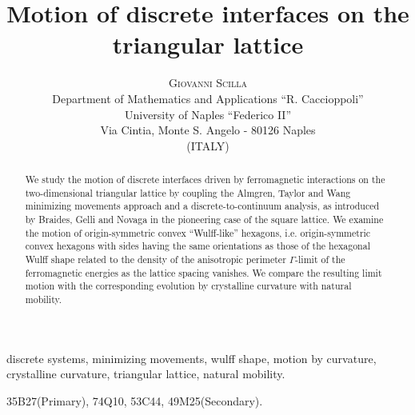 \documentclass{interact}
\numberwithin{equation}{section}
\theoremstyle{definition}
\begin{document}
\title{Motion of discrete interfaces on the triangular lattice}

\author{{\scshape Giovanni Scilla}\\
Department of Mathematics and Applications ``R. Caccioppoli''\\ University of Naples ``Federico II''\\
Via Cintia, Monte S. Angelo - 80126 Naples \\
(ITALY)}
\date{}


\maketitle

\begin{abstract}\noindent
We study the motion of discrete interfaces driven by ferromagnetic interactions on the two-dimensional triangular lattice by coupling the Almgren, Taylor and Wang minimizing movements approach and a discrete-to-continuum analysis, as introduced by Braides, Gelli and Novaga in the pioneering case of the square lattice. We examine the motion of origin-symmetric convex ``Wulff-like'' hexagons, i.e. origin-symmetric convex hexagons with sides having the same orientations as those of the %
hexagonal Wulff shape related to the density of the anisotropic perimeter %
$\Gamma$-limit of the ferromagnetic energies as the lattice spacing vanishes.%
We compare the resulting limit motion %
with the corresponding evolution by crystalline curvature with natural mobility.
\end{abstract}

\begin{keywords}
discrete systems, minimizing movements, wulff shape, motion by curvature, crystalline curvature, triangular lattice, natural mobility.
\end{keywords}

\begin{amscode}
35B27(Primary), 74Q10, 53C44, 49M25(Secondary).
\end{amscode}
\end{document}
